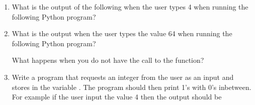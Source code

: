 \documentclass[letterpaper,10pt,english]{sphinxmanual}
\begin{document}
\begin{enumerate}
\item {} 
What is the output of the following when the user types 4 when
running the following Python program?

%
\begin{sphinxVerbatim}[commandchars=\\\{\}]
  
  
  
  
 
\end{sphinxVerbatim}

\item {} 
What is the output when the user types the value 64 when running
the following Python program?

%
\begin{sphinxVerbatim}[commandchars=\\\{\}]
  
    
    
    
\end{sphinxVerbatim}

What happens when you do not have the call to the  function?

\item {} 
Write a program that requests an integer from the user as an input
and stores in the variable .  The program should then print
 1’s with 0’s inbetween.  For example if the user input the
value 4 then the output should be

%
\begin{sphinxVerbatim}[commandchars=\\\{\}]
\end{sphinxVerbatim}

\end{enumerate}
\end{document}
